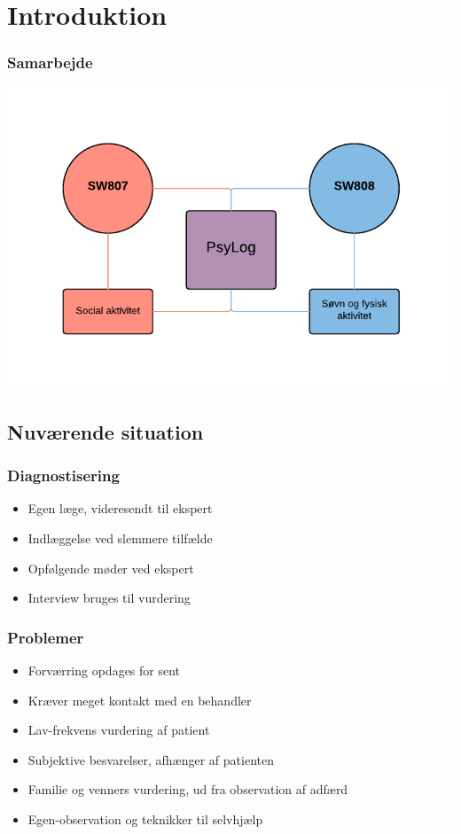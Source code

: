 \section{Introduktion}

\begin{frame}
\frametitle{Samarbejde}

\includegraphics[width=\textwidth]{graphics/samarbejde.pdf}

\end{frame}

\subsection{Nuværende situation}

\begin{frame}
\frametitle{Diagnostisering}

\begin{itemize}
\item Egen læge, videresendt til ekspert
\item Indlæggelse ved slemmere tilfælde
\item Opfølgende møder ved ekspert
\item Interview bruges til vurdering
\end{itemize}

\end{frame}

\begin{frame}
\frametitle{Problemer}
\begin{itemize}
\item Forværring opdages for sent
\item Kræver meget kontakt med en behandler
\item Lav-frekvens vurdering af patient
\item Subjektive besvarelser, afhænger af patienten
\item Familie og venners vurdering, ud fra observation af adfærd
\item Egen-observation og teknikker til selvhjælp
\end{itemize}

\end{frame}

